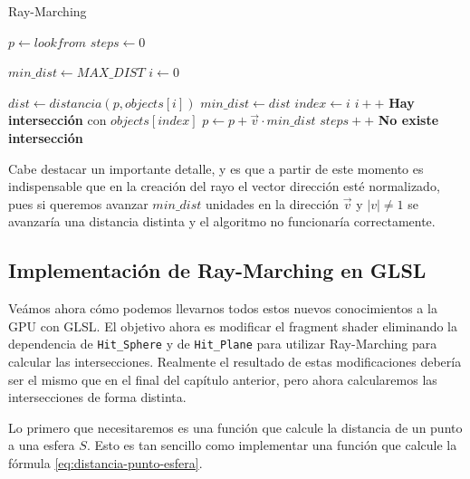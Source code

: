 \begin{algorithm}[H]
\caption{Ray-Marching} \label{alg:Ray-Marching}
\begin{algorithmic}
\State $p\gets lookfrom$
\State $steps \gets 0$

 
    \State $min\_dist \gets MAX\_DIST$
    \State $i\gets 0$

    
        \State $dist \gets distancia(p, objects[i])$
            \State $min\_dist \gets dist$
            \State $index\gets i$
        \EndIf
        \State $i++$
    \EndWhile
        \State \textbf{Hay intersección} con $objects[index]$
    \Else
        \State $p\gets p + \vec v \cdot min\_dist$ 
    \EndIf
    \State $steps++$
\EndWhile
\State \textbf{No existe intersección}
\end{algorithmic}
\end{algorithm}

\begin{observacion}
\label{observacion:vector-normalizado}
    Cabe destacar un importante detalle, y es que a partir de este momento es indispensable que en la creación del rayo el vector dirección esté normalizado, pues si queremos avanzar $min\_dist$ unidades en la dirección $\vec v$ y $|v| \not= 1$ se avanzaría una distancia distinta y el algoritmo no funcionaría correctamente.
\end{observacion}

\subsection{Implementación de Ray-Marching en GLSL}

Veámos ahora cómo podemos llevarnos todos estos nuevos conocimientos a la GPU con GLSL. El objetivo ahora es modificar el fragment shader eliminando la dependencia de \verb|Hit_Sphere| y de \verb|Hit_Plane| para utilizar Ray-Marching para calcular las intersecciones. Realmente el resultado de estas modificaciones debería ser el mismo que en el final del capítulo anterior, pero ahora calcularemos las intersecciones de forma distinta. 

Lo primero que necesitaremos es una función que calcule la distancia de un punto a una esfera $S$. Esto es tan sencillo como implementar una función que calcule la fórmula \ref{eq:distancia-punto-esfera}.

